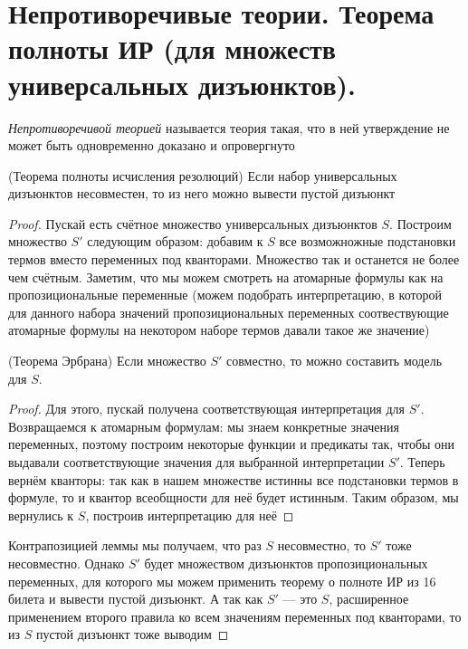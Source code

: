 \documentclass{article}
\begin{document}
\section{Непротиворечивые теории. Теорема полноты ИР (для множеств универсальных дизъюнктов).}
\begin{definition}
	\textit{Непротиворечивой теорией} называется теория такая, что в ней утверждение не может быть одновременно доказано и опровергнуто
\end{definition}

\begin{theorem}{(Теорема полноты исчисления резолюций)}
	Если набор универсальных дизъюнктов несовместен, то из него можно вывести пустой дизъюнкт
\end{theorem}
\begin{proof}
	Пускай есть счётное множество универсальных дизъюнктов \(S\). Построим множество \(S'\) следующим образом: добавим к \(S\) все возможножные подстановки термов вместо переменных под кванторами. Множество так и останется не более чем счётным. Заметим, что мы можем смотреть на атомарные формулы как на пропозициональные переменные (можем подобрать интерпретацию, в которой для данного набора значений пропозициональных переменных соотвествующие атомарные формулы на некотором наборе термов давали такое же значение)

	\begin{lemma}{(Теорема Эрбрана)}
	    Если множество \(S'\) совместно, то можно составить модель для \(S\).
	\end{lemma}

	\begin{proof}
	     Для этого, пускай получена соответствующая интерпретация для \(S'\). Возвращаемся к атомарным формулам: мы знаем конкретные значения переменных, поэтому построим некоторые функции и предикаты так, чтобы они выдавали соответствующие значения для выбранной интерпретации \(S'\). Теперь вернём кванторы: так как в нашем множестве истинны все подстановки термов в формуле, то и квантор всеобщности для неё будет истинным. Таким образом, мы вернулись к \(S\), построив интерпретацию для неё
	\end{proof}

	Контрапозицией леммы мы получаем, что раз \(S\) несовместно, то \(S'\) тоже несовместно. Однако \(S'\) будет множеством дизъюнктов пропозициональных переменных, для которого мы можем применить теорему о полноте ИР из 16 билета и вывести пустой дизъюнкт. А так как \(S'\) --- это \(S\), расширенное применением второго правила ко всем значениям переменных под кванторами, то из \(S\) пустой дизъюнкт тоже выводим

\end{proof}
\end{document}
